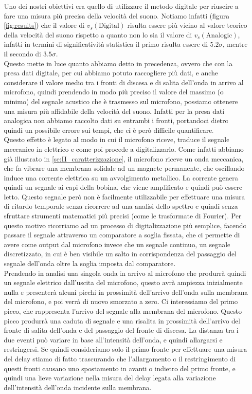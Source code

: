 \documentclass[
    prl,
    reprint, 
    superscriptaddress, 
    altaffilletter, 
    amsmath, 
    amssymb, 
    a4paper,
    varvw]{revtex4-2}
\begin{document}
Uno dei nostri obiettivi era quello di utilizzare il metodo digitale per riuscire a fare una misura più precisa della velocità del suono. Notiamo infatti (figura \ref{fig:results}) che il valore di $v_s(\text{Digital})$ risulta essere più vicino al valore teorico della velocità del suono rispetto a quanto non lo sia il valore di $v_s(\text{Analogic})$, infatti in termini di significatività statistica il primo risulta essere di $5.2\sigma$, mentre il secondo di $3.5\sigma$. \\
Questo mette in luce quanto abbiamo detto in precedenza, ovvero che con la presa dati digitale, per cui abbiamo potuto raccogliere più dati, e anche considerare il valore medio tra i fronti di discesa e di salita dell'onda in arrivo al microfono, quindi prendendo in modo più preciso il valore del massimo (o minimo) del segnale acustico che è trasmesso sul microfono, possiamo ottenere una misura più affidabile della velocità del suono. Infatti per la presa dati analogica non abbiamo raccolto dati su entrambi i fronti, portandoci dietro quindi un possibile errore sui tempi, che ci è però difficile quantificare. \\
Questo effetto è legato al modo in cui il microfono riceve, traduce il segnale meccanico in elettrico e come poi procede a digitalizzarlo. Come infatti abbiamo già illustrato in \ref{se:II_caratterizzazione}, il microfono riceve un onda meccanica, che fa vibrare una membrana solidale ad un magnete permanente, che oscillando induce una corrente elettrica su un avvolgimento metallico. La corrente genera quindi un segnale ai capi della bobina, che viene amplificato e quindi può essere letto. Questo segnale però non è facilmente utilizzabile per effettuare una misura di ritardo temporale senza ricorrere ad una analisi dello spettro e quindi senza sfruttare strumenti matematici più precisi (come le trasformate di Fourier). Per questo motivo ricorriamo ad un processo di digitalizzazione più semplice, facendo passare il segnale attraverso un comparatore a soglia fissata, che ci permette di avere come output dal microfono invece che un segnale continuo, un segnale discretizzato, in cui è ben visibile un salto in corrispondenza del passaggio del segnale dell'onda oltre la soglia imposta dal comparatore. \\
Prendendo in analisi una singola onda in arrivo al microfono che produrrà quindi un segnale elettrico dall'uscita del microfono, questo avrà ampiezza inizialmente nulla e presenterà alcuni picchi in prossimità dell'arrivo dell'onda sulla membrana del microfono, e poi verrà di nuovo smorzato a zero. Ci interessiamo del primo picco, che rappresenta l'arrivo del segnale alla membrana del microfono. Questo picco produrrà una caduta di segnale e una risalita in prossimità dell'arrivo del fronte di salita dell'onda e del passaggio del fronte di discesa. La distanza tra i due eventi può variare in base all'intensità dell'onda, e quindi allargarsi e restringersi. Se quindi consideriamo solo il primo fronte per effettuare una misura del delay stiamo di fatto trascurando che l'allargamento o il restringimento di questi fronti causano uno spostamento in avanti o indietro del primo fronte, e quindi una lieve variazione nella misura del delay legata alla variazione dell'intensità dell'onda incidente sulla membrana. \\
\end{document}
